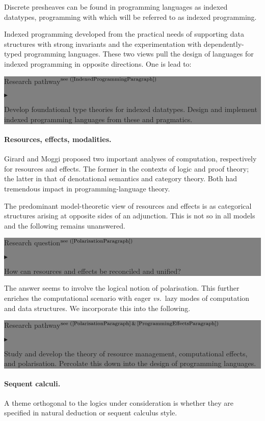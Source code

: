 \documentclass[11pt,twocolumn]{article}
\newenvironment{btritemize}
  {\begin{list}{\btr}
  {\setlength{\topsep}{2pt}
   \setlength{\partopsep}{2pt}
   \setlength{\itemsep}{2.5pt}
   \setlength{\parsep}{2.5pt}
   \setlength{\leftmargin}{1em}
   \setlength{\labelwidth}{.5em}}}
  {\end{list}}
\newcommand{\mytextsf}[1]{\textsf{\small #1}}
\newcommand{\vs}{\emph{vs.}}
\newcommand{\btr}{$\blacktriangleright$}
\newcommand{\reqpsize}{8.113395cm}%
\newcommand{\req}[2]{\begin{center}\colorbox{grey}{\begin{minipage}{\reqpsize} 
  \mytextsf{Research question}\hfill$^{\mbox{\scriptsize see (#1) }}$\\[-5.5mm]
  \begin{btritemize}
  \item #2
  \end{btritemize}
\end{minipage}}\end{center}}
\newcommand{\rep}[2]{\begin{center}\colorbox{grey}{\begin{minipage}{\reqpsize}
  \mytextsf{Research pathway}\hfill$^{\mbox{\scriptsize see (#1) }}$\\[-5.5mm]
  \begin{btritemize}
  \item #2
  \end{btritemize}
\end{minipage}}\end{center}}
\begin{document}
Discrete %
pre\-sheaves can be found in programming languages as
indexed data\-types, programming with which will be referred to as indexed
programming.  

Indexed programming developed from the practical needs of supporting data
structures with strong invariants and the experimentation with
dependently-typed programming languages. %
These two views pull the design of languages for indexed programming in
opposite directions.  One is lead to:
\rep{\ref{IndexedProgrammingParagraph}} 
  {Develop foundational type theories for indexed datatypes.  
   Design and implement indexed programming languages from these and
   pragmatics.}

\paragraph*{Resources, effects, modalities.}

Girard %
and Moggi %
proposed two important analyses of computation, respectively for resources and
effects.  The former in the contexts of logic and proof theory; the latter in
that of denotational semantics and category theory.  Both had tremendous
impact in programming-language theory.  

The predominant model-theoretic view of resources and effects is as
categorical structures arising at opposite sides of an adjunction.  This is
not so in all models and the following remains unanswered.
%
\req{\ref{PolarisationParagraph}}
  {How can resources and effects be reconciled and unified?}
%
The answer seems to involve the logical notion of
polarisation. %
This further enriches the computational scenario with eager \vs~lazy modes of
computation and data structures.  We incorporate this into the following.
%
\rep{\ref{PolarisationParagraph}\,\&\,\ref{ProgrammingEffectsParagraph}}
  {Study and develop the theory of resource management, computational
    effects, and polarisation.  Percolate this down into the design of
    programming languages.}

\paragraph*{Sequent calculi.}

A theme orthogonal to the logics under consideration is whether they are
specified in natural deduction or sequent calculus style. 
\end{document}
